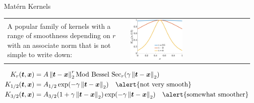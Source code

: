 \documentclass[10pt,compress,xcolor={usenames,dvipsnames},aspectratio=169]{beamer}
\begin{document}
\begin{frame}{Mat\'ern Kernels}
	
	\vspace{-5ex}
	\begin{tabular}{b{}p{}}
		A popular family of kernels with a range of smoothness depending on $r$ with an associate norm that is not simple to write down:
		& 	\includegraphics[width=0.45\textwidth]{RK-maternkerthreehalfs.eps}
	\end{tabular}
	\begin{align*}
		K_r(\vt,\vx) &= A \norm[2]{\vt - \vx}^r \text{Mod Bessel Sec}_r (\gamma \norm[2]{\vt - \vx}) \\
		K_{1/2}(\vt,\vx) & = A_{1/2} \exp(-\gamma\norm[2]{\vt - \vx} )  \quad \alert{\text{not very smooth}} \\
		K_{3/2}(\vt,\vx) & = A_{3/2} (1 + \gamma\norm[2]{\vt - \vx} ) \exp(-\gamma\norm[2]{\vt - \vx} )  \quad \alert{\text{somewhat  smoother}}
	\end{align*}
	
	
\end{frame}
\end{document}
